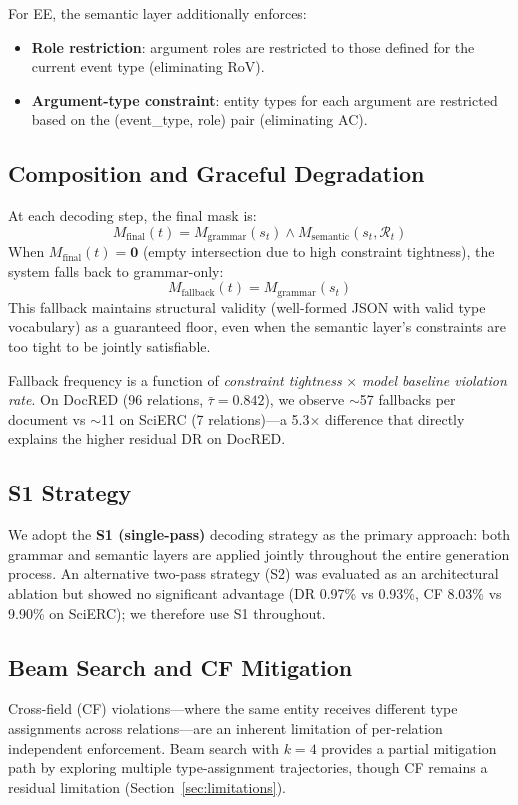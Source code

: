 \documentclass[11pt]{article}
\begin{document}
For EE, the semantic layer additionally enforces:
\begin{itemize}[nosep,leftmargin=*]
\item \textbf{Role restriction}: argument roles are restricted to those defined for the current event type (eliminating RoV).
\item \textbf{Argument-type constraint}: entity types for each argument are restricted based on the (event\_type, role) pair (eliminating AC).
\end{itemize}

\subsection{Composition and Graceful Degradation}
At each decoding step, the final mask is:
\begin{equation}
M_{\text{final}}(t) = M_{\text{grammar}}(s_t) \wedge M_{\text{semantic}}(s_t, \mathcal{R}_t)
\end{equation}
When $M_{\text{final}}(t) = \mathbf{0}$ (empty intersection due to high constraint tightness), the system falls back to grammar-only:
\begin{equation}
M_{\text{fallback}}(t) = M_{\text{grammar}}(s_t)
\end{equation}
This fallback maintains structural validity (well-formed JSON with valid type vocabulary) as a guaranteed floor, even when the semantic layer's constraints are too tight to be jointly satisfiable.

Fallback frequency is a function of \emph{constraint tightness} $\times$ \emph{model baseline violation rate}.
On DocRED (96 relations, $\bar{\tau}=0.842$), we observe $\sim$57 fallbacks per document vs $\sim$11 on SciERC (7 relations)---a 5.3$\times$ difference that directly explains the higher residual DR on DocRED.

\subsection{S1 Strategy}
We adopt the \textbf{S1 (single-pass)} decoding strategy as the primary approach: both grammar and semantic layers are applied jointly throughout the entire generation process.
An alternative two-pass strategy (S2) was evaluated as an architectural ablation but showed no significant advantage (DR 0.97\% vs 0.93\%, CF 8.03\% vs 9.90\% on SciERC); we therefore use S1 throughout.

\subsection{Beam Search and CF Mitigation}
\label{sec:beam}
Cross-field (CF) violations---where the same entity receives different type assignments across relations---are an inherent limitation of per-relation independent enforcement.
Beam search with $k=4$ provides a partial mitigation path by exploring multiple type-assignment trajectories, though CF remains a residual limitation (Section~\ref{sec:limitations}).
\end{document}
